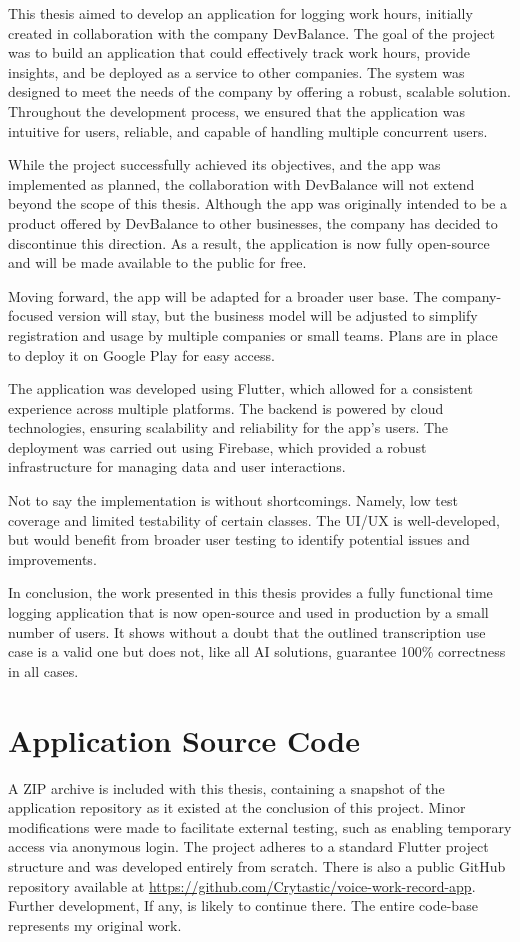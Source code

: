 \documentclass[
  digital,     %
  oneside,     %
  nosansbold,  %
  nocolorbold, %
  lof,         %
  lot,         %
]{fithesis4}
\begin{document}
This thesis aimed to develop an application for logging work hours, initially created in collaboration with the company DevBalance. The goal of the project was to build an application that could effectively track work hours, provide insights, and be deployed as a service to other companies. The system was designed to meet the needs of the company by offering a robust, scalable solution. Throughout the development process, we ensured that the application was intuitive for users, reliable, and capable of handling multiple concurrent users.

While the project successfully achieved its objectives, and the app was implemented as planned, the collaboration with DevBalance will not extend beyond the scope of this thesis. Although the app was originally intended to be a product offered by DevBalance to other businesses, the company has decided to discontinue this direction. As a result, the application is now fully open-source and will be made available to the public for free.

Moving forward, the app will be adapted for a broader user base. The company-focused version will stay, but the business model will be adjusted to simplify registration and usage by multiple companies or small teams. Plans are in place to deploy it on Google Play for easy access.

The application was developed using Flutter, which allowed for a consistent experience across multiple platforms. The backend is powered by cloud technologies, ensuring scalability and reliability for the app’s users. The deployment was carried out using Firebase, which provided a robust infrastructure for managing data and user interactions.

Not to say the implementation is without shortcomings. Namely, low test coverage and limited testability of certain classes. The \gls{UI}/\gls{UX} is well-developed, but would benefit from broader user testing to identify potential issues and improvements.

In conclusion, the work presented in this thesis provides a fully functional time logging application that is now open-source and used in production by a small number of users. It shows without a doubt that the outlined transcription use case is a valid one but does not, like all \gls{AI} solutions, guarantee 100\% correctness in all cases.

\shorthandon{-}

\appendix %
\chapter{Application Source Code}
A ZIP archive is included with this thesis, containing a snapshot of the application repository as it existed at the conclusion of this project. Minor modifications were made to facilitate external testing, such as enabling temporary access via anonymous login. The project adheres to a standard Flutter project structure and was developed entirely from scratch. There is also a public GitHub repository available at \url{https://github.com/Crytastic/voice-work-record-app}. Further development, If any, is likely to continue there. The entire code-base represents my original work.
\end{document}
